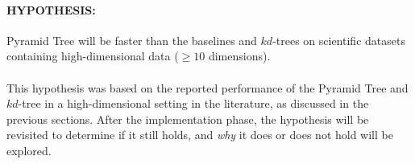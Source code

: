 \paragraph{\textbf{HYPOTHESIS:}} Pyramid Tree will be faster than the baselines and $kd$-trees on scientific datasets containing high-dimensional data ($\geq 10$ dimensions).

\paragraph{}

This hypothesis was based on the reported performance of the Pyramid Tree and $kd$-tree in a high-dimensional setting in the literature, as discussed in the previous sections. After the implementation phase, the hypothesis will be revisited to determine if it still holds, and \textit{why} it does or does not hold will be explored.